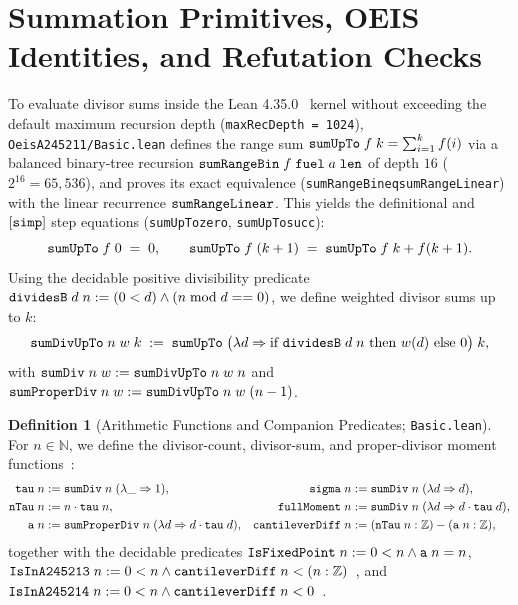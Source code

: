 \documentclass[11pt,reqno]{amsart}
\theoremstyle{plain}
\theoremstyle{definition}
\newtheorem{definition}[theorem]{Definition}
\theoremstyle{remark}
\newcommand{\leanid}[1]{\texttt{\upshape\def\_{\char95\relax}#1}}
\newcommand{\Z}{\mathbb{Z}}
\newcommand{\N}{\mathbb{N}}
\begin{document}
\section{Summation Primitives, OEIS Identities, and Refutation Checks}

To evaluate divisor sums inside the Lean 4.35.0~\cite{deMouraUllrich2021} kernel without exceeding the default maximum recursion depth (\texttt{maxRecDepth = 1024}), \leanid{OeisA245211/Basic.lean} defines the range sum $\leanid{sumUpTo}\;f\;k = \sum_{i=1}^k f(i)$ via a balanced binary-tree recursion $\leanid{sumRangeBin}\;f\;\leanid{fuel}\;a\;\leanid{len}$ of depth $16$ ($2^{16} = 65{,}536$), and proves its exact equivalence (\leanid{sumRangeBin\_\allowbreak eq\_\allowbreak sumRangeLinear}) with the linear recurrence $\leanid{sumRangeLinear}$. This yields the definitional and $[\leanid{simp}]$ step equations (\leanid{sumUpTo\_\allowbreak zero}, \leanid{sumUpTo\_\allowbreak succ}):
\[
  \leanid{sumUpTo}\;f\;0 \;=\; 0,
  \qquad
  \leanid{sumUpTo}\;f\;(k + 1) \;=\; \leanid{sumUpTo}\;f\;k + f(k + 1).
\]
Using the decidable positive divisibility predicate $\leanid{dividesB}\;d\;n := (0 < d) \land (n \bmod d == 0)$, we define weighted divisor sums up to $k$:
\[
  \leanid{sumDivUpTo}\;n\;w\;k \;:=\; \leanid{sumUpTo}\;\bigl(\lambda d \Rightarrow \text{if }\leanid{dividesB}\;d\;n\text{ then }w(d)\text{ else }0\bigr)\;k,
\]
with $\leanid{sumDiv}\;n\;w := \leanid{sumDivUpTo}\;n\;w\;n$ and $\leanid{sumProperDiv}\;n\;w := \leanid{sumDivUpTo}\;n\;w\;(n - 1)$.

\begin{definition}[Arithmetic Functions and Companion Predicates; \leanid{Basic.lean}]
For $n \in \N$, we define the divisor-count, divisor-sum, and proper-divisor moment functions~\cite{OEIS-A000005,OEIS-A000203,OEIS-A038040,OEIS-A060640,OEIS-A245211,OEIS-A245212}:
\begin{align*}
  \leanid{tau}\;n &:= \leanid{sumDiv}\;n\;(\lambda \_ \Rightarrow 1), &
  \leanid{sigma}\;n &:= \leanid{sumDiv}\;n\;(\lambda d \Rightarrow d), \\
  \leanid{nTau}\;n &:= n \cdot \leanid{tau}\;n, &
  \leanid{fullMoment}\;n &:= \leanid{sumDiv}\;n\;(\lambda d \Rightarrow d \cdot \leanid{tau}\;d), \\
  \leanid{a}\;n &:= \leanid{sumProperDiv}\;n\;(\lambda d \Rightarrow d \cdot \leanid{tau}\;d), &
  \leanid{cantileverDiff}\;n &:= (\leanid{nTau}\;n : \Z) - (\leanid{a}\;n : \Z),
\end{align*}
together with the decidable predicates $\leanid{IsFixedPoint}\;n := 0 < n \land \leanid{a}\;n = n$, $\leanid{IsInA245213}\;n := 0 < n \land \leanid{cantileverDiff}\;n < (n : \Z)$~\cite{OEIS-A245213}, and $\leanid{IsInA245214}\;n := 0 < n \land \leanid{cantileverDiff}\;n < 0$~\cite{OEIS-A245214}.
\end{definition}
\end{document}
